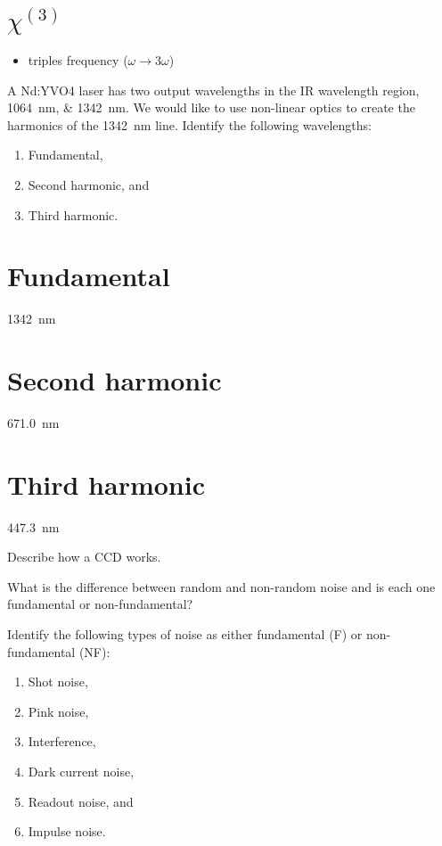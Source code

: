 \documentclass{hw}
\begin{document}
\part{$\chi^{\left(3\right)}$}

\begin{itemize}
    \item triples frequency ($\omega \rightarrow 3\omega$)
\end{itemize}

\problem{}

A Nd:YVO4 laser has two output wavelengths in the IR wavelength region, \SIlist{1064;1342}{\nano\meter}. We would like to use non-linear optics to create the harmonics of the \SI{1342}{\nano\meter} line. Identify the following wavelengths:
\begin{enumerate}
    \item Fundamental,
    \item Second harmonic, and
    \item Third harmonic.
\end{enumerate}

\solution

\part{Fundamental}

\SI{1342}{\nano\meter}

\part{Second harmonic}

\SI{671.0}{\nano\meter}

\part{Third harmonic}

\SI{447.3}{\nano\meter}

\problem{}

Describe how a CCD works.

\solution



\problem{}

What is the difference between random and non-random noise and is each one fundamental or non-fundamental?

\solution



\problem{}

Identify the following types of noise as either fundamental (F) or non-fundamental (NF):
\begin{enumerate}
    \item Shot noise,
    \item Pink noise,
    \item Interference,
    \item Dark current noise,
    \item Readout noise, and
    \item Impulse noise.
\end{enumerate}
\end{document}
